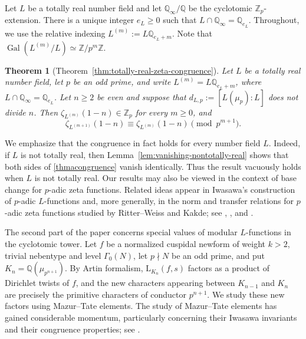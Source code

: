 \documentclass[11pt,table]{amsart}
\newtheorem{lthm}{Theorem}
\newcommand{\Z}{\mathbb{Z}}
\newcommand{\Q}{\mathbb{Q}}
\newcommand{\op}[1]{\operatorname{#1}}
\numberwithin{equation}{section}
\begin{document}
\par Let \(L\) be a totally real number field and let
\(\mathbb Q_\infty/\mathbb Q\) be the cyclotomic
\(\mathbb Z_p\)-extension. There is a unique integer \(e_L\geq0\)
such that $L\cap\mathbb Q_\infty
        =
        \mathbb Q_{e_L}$. Throughout, we use the relative
indexing $L^{(m)}
        :=
        L\mathbb Q_{e_L+m}$. Note that $\op{Gal}(L^{(m)}/L)\simeq \Z/p^m\Z$.
\begin{lthm}[Theorem~\ref{thm:totally-real-zeta-congruence}]
\label{lthm a}
Let \(L\) be a totally real number field, let \(p\) be an odd prime,
and write \(L^{(m)}=L\mathbb Q_{e_L+m}\), where
\(L\cap\mathbb Q_\infty=\mathbb Q_{e_L}\).  Let \(n\geq2\) be even
and suppose that \(d_{L,p}:=[L(\mu_p):L]\) does not divide \(n\). Then \(\zeta_{L^{(m)}}(1-n)\in\mathbb Z_p\) for every
\(m\geq0\), and \begin{equation}\label{thmacongruence}\zeta_{L^{(m+1)}}(1-n)\equiv\zeta_{L^{(m)}}(1-n)
\pmod{p^{m+1}}.\end{equation}
\end{lthm}
\noindent We emphasize that the congruence in fact holds for every number field
\(L\).  Indeed, if \(L\) is not totally real, then Lemma~\ref{lem:vanishing-nontotally-real} shows that
both sides of \eqref{thmacongruence} vanish identically. Thus the result vacuously holds when $L$ is not totally real. Our results may also be viewed in the context of base change for
\(p\)-adic zeta functions.  Related ideas appear in Iwasawa's
construction of \(p\)-adic \(L\)-functions and, more generally, in the
norm and transfer relations for \(p\)-adic zeta functions studied by
Ritter--Weiss and Kakde; see
\cite[\S3,6--7]{IwasawaPadicL},
\cite[\S2]{RitterWeissPseudomeasures}, and
\cite[Theorem~94 and Proposition~95]{KakdeTotallyReal}. \par The second part of the paper concerns special values of modular
\(L\)-functions in the cyclotomic tower.  Let \(f\) be a normalized
cuspidal newform of weight \(k>2\), trivial nebentype and level
\(\Gamma_0(N)\), let \(p\nmid N\) be an odd prime, and put $K_n=\Q(\mu_{p^{n+1}})$.
By Artin formalism, \(\mathrm{L}_{K_n}(f,s)\) factors as a product of Dirichlet
twists of \(f\), and the new characters appearing between
\(K_{n-1}\) and \(K_n\) are precisely the primitive characters of
conductor \(p^{n+1}\).  We study these new factors using Mazur--Tate
elements. The study of Mazur--Tate elements has gained considerable momentum, particularly concerning their Iwasawa invariants and their congruence properties; see \cite{MazurTate,PollackWeston}.
\end{document}
